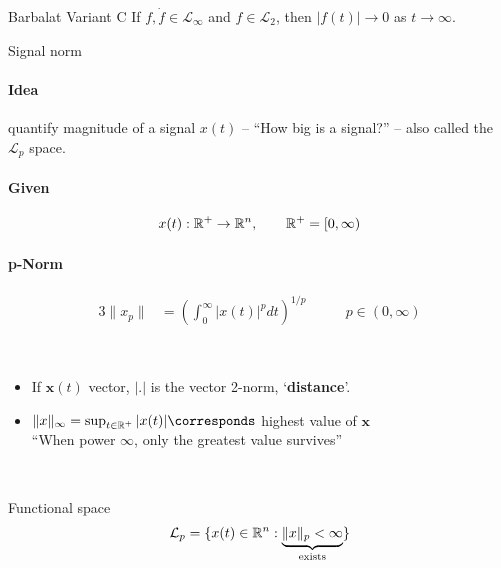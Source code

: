 \begin{lemma}{Barbalat Variant C}
If $f, \dot{f} \in \mathcal{L}_\infty$ 
and $f \in \mathcal{L}_2$,
then  $|f(t)| \rightarrow 0$ as $t \rightarrow \infty$.
\end{lemma}


\begin{definition}{Signal norm}
\paragraph{Idea} quantify magnitude of a signal $x(t)$
-- ``How big is a signal?'' -- also called the $\mathcal{L}_p$ space.\\

\paragraph{Given}
\begin{alignat*}{3}
x(t): \mathbb{R}^+ \rightarrow \mathbb{R}^n, \quad  \quad \mathbb{R}^+ = [0, \infty)
\end{alignat*}

\paragraph{p-Norm}
    \begin{alignat*}{3}
    \|x_p\| &= \left( \int_0^\infty |x(t)|^p dt \right)^{1/p}
        & \qquad p \in (0, \infty)
    \end{alignat*}
\end{definition}~

\begin{itemize}
\item If $\bm{x}(t)$ vector, $|.|$ is the vector 2-norm,
    `\textbf{distance}'.
\item $\|x\|_\infty = \sup_{t \in \R^+} |x(t)| \corresponds$ 
    highest value of $\bm{x}$\\
    ``When power $\infty$, only the greatest value survives''
\end{itemize}~

\begin{definition}{Functional space}
\begin{alignat*}{3}
\mathcal{L}_p = \{x(t) \in \mathbb{R}^n : \underbrace{\| x \|_p < \infty}_{\textnormal{exists}} \}
\end{alignat*}
\end{definition}~

